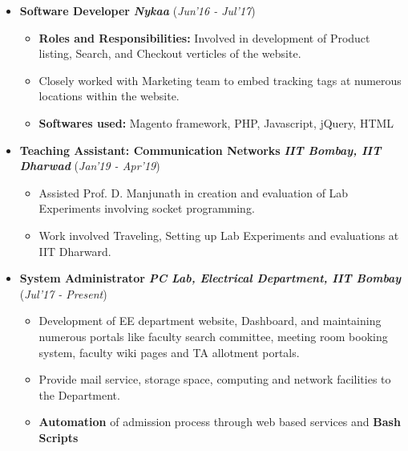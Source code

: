 \documentclass[10pt]{article}
\newcommand{\highlight}[1]{\framecolorbox[\textwidth]{black}{bl}{\makebox[\textwidth][l]{\bfseries \color{black} #1}}}
\newcommand{\mystyle}[1]{\textit{\textbf{\textcolor{llb}{#1}}}}
\begin{document}
\highlight{WORK EXPERIENCE}
\begin{itemize}
	\item \textbf{Software Developer} \textpipe  \hspace{0.05cm} \mystyle{Nykaa} \hfill{(\textit{Jun'16 - Jul'17})}\\[-0.6cm]
	\begin{itemize}
		\item \textbf{Roles and Responsibilities:} Involved in development of Product listing, Search, and Checkout verticles of the website.
		\item Closely worked with Marketing team to embed  tracking tags at numerous locations within the website.
		\item \textbf{Softwares used:} Magento framework, PHP, Javascript, jQuery, HTML
	\end{itemize}
	
	\item \textbf{Teaching Assistant: Communication Networks} \textpipe \hspace{0.05cm} \mystyle{IIT Bombay, IIT Dharwad} \hfill{(\textit{Jan'19 - Apr'19})}\\[-0.6cm]
	\begin{itemize}
		\item Assisted Prof. D. Manjunath in creation and evaluation of Lab Experiments involving socket programming.
		\item Work involved Traveling, Setting up Lab Experiments and evaluations at IIT Dharward.
	\end{itemize}
	
	
	\item \textbf{System Administrator} \textpipe \hspace{0.05cm} \mystyle{PC Lab, Electrical Department, IIT Bombay} \hfill{(\textit{Jul'17 - Present})}\\[-0.6cm]
	\begin{itemize}
		\item Development of EE department website, Dashboard, and maintaining numerous portals like faculty search committee, meeting room booking system, faculty wiki pages and TA allotment portals.
		\item Provide mail service, storage space, computing and network facilities to the Department.
		\item \textbf{Automation} of admission process through web based services and \textbf{Bash Scripts}
	\end{itemize}
	
\end{itemize}
\end{document}
